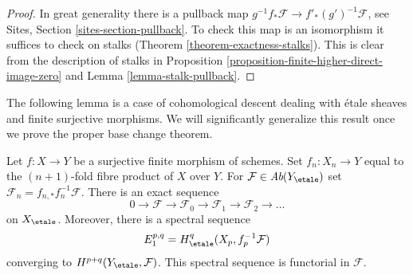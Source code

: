 \begin{proof}
In great generality there is a pullback map
$g^{-1}f_*\mathcal{F} \to f'_*(g')^{-1}\mathcal{F}$, see
Sites, Section \ref{sites-section-pullback}.
To check this map is an isomorphism it suffices to check
on stalks (Theorem \ref{theorem-exactness-stalks}).
This is clear from the description of stalks
in Proposition \ref{proposition-finite-higher-direct-image-zero} and
Lemma \ref{lemma-stalk-pullback}.
\end{proof}

\noindent
The following lemma is a case of cohomological descent dealing with
\'etale sheaves and finite surjective morphisms. We will significantly
generalize this result once we prove the proper base change theorem.

\begin{lemma}
\label{lemma-cohomological-descent-finite}
Let $f : X \to Y$ be a surjective finite morphism of schemes.
Set $f_n : X_n \to Y$ equal to the $(n + 1)$-fold fibre product
of $X$ over $Y$. For $\mathcal{F} \in \textit{Ab}(Y_\etale)$ set
$\mathcal{F}_n = f_{n, *}f_n^{-1}\mathcal{F}$. There is an exact
sequence
$$
0 \to \mathcal{F} \to \mathcal{F}_0 \to \mathcal{F}_1 \to
\mathcal{F}_2 \to \ldots
$$
on $X_\etale$. Moreover, there is a spectral sequence
$$
E_1^{p, q} = H^q_\etale(X_p, f_p^{-1}\mathcal{F})
$$
converging to $H^{p + q}(Y_\etale, \mathcal{F})$.
This spectral sequence is functorial in $\mathcal{F}$.
\end{lemma}

